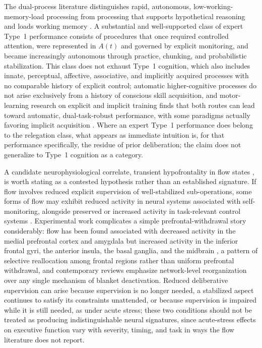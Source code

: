 The dual-process literature distinguishes rapid, autonomous, low-working-memory-load processing from processing that supports hypothetical reasoning and loads working memory \cite{evans2013}. A substantial and well-supported class of expert Type~1 performance consists of procedures that once required controlled attention, were represented in $A(t)$ and governed by explicit monitoring, and became increasingly autonomous through practice, chunking, and probabilistic stabilization. This class does not exhaust Type~1 cognition, which also includes innate, perceptual, affective, associative, and implicitly acquired processes with no comparable history of explicit control; automatic higher-cognitive processes do not arise exclusively from a history of conscious skill acquisition, and motor-learning research on explicit and implicit training finds that both routes can lead toward automatic, dual-task-robust performance, with some paradigms actually favoring implicit acquisition \cite{kal2018}. Where an expert Type~1 performance does belong to the relegation class, what appears as immediate intuition is, for that performance specifically, the residue of prior deliberation; the claim does not generalize to Type~1 cognition as a category.

A candidate neurophysiological correlate, transient hypofrontality in flow states \cite{dietrich2003}, is worth stating as a contested hypothesis rather than an established signature. If flow involves reduced explicit supervision of well-stabilized sub-operations, some forms of flow may exhibit reduced activity in neural systems associated with self-monitoring, alongside preserved or increased activity in task-relevant control systems \cite{dietrich2004,csikszentmihalyi1990}. Experimental work complicates a simple prefrontal-withdrawal story considerably: flow has been found associated with decreased activity in the medial prefrontal cortex and amygdala but increased activity in the inferior frontal gyri, the anterior insula, the basal ganglia, and the midbrain \cite{ulrich2014}, a pattern of selective reallocation among frontal regions rather than uniform prefrontal withdrawal, and contemporary reviews emphasize network-level reorganization over any single mechanism of blanket deactivation. Reduced deliberative supervision can arise because supervision is no longer needed, a stabilized aspect continues to satisfy its constraints unattended, or because supervision is impaired while it is still needed, as under acute stress; these two conditions should not be treated as producing indistinguishable neural signatures, since acute-stress effects on executive function vary with severity, timing, and task in ways the flow literature does not report.


